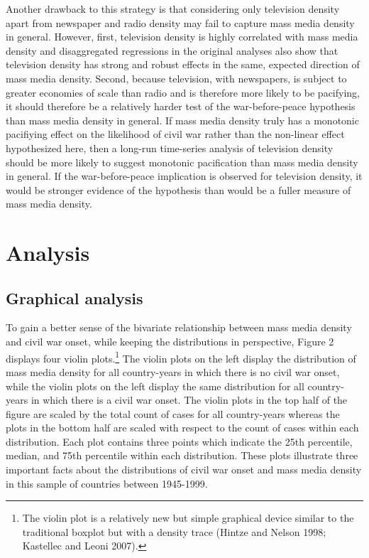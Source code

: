 \documentclass[11pt,article,oneside]{memoir}
\begin{document}
Another drawback to this strategy is that considering only television
density apart from newspaper and radio density may fail to capture mass
media density in general. However, first, television density is highly
correlated with mass media density and disaggregated regressions in the
original analyses also show that television density has strong and
robust effects in the same, expected direction of mass media density.
Second, because television, with newspapers, is subject to greater
economies of scale than radio and is therefore more likely to be
pacifying, it should therefore be a relatively harder test of the
war-before-peace hypothesis than mass media density in general. If mass
media density truly has a monotonic pacifiying effect on the likelihood
of civil war rather than the non-linear effect hypothesized here, then a
long-run time-series analysis of television density should be more
likely to suggest monotonic pacification than mass media density in
general. If the war-before-peace implication is observed for television
density, it would be stronger evidence of the hypothesis than would be a
fuller measure of mass media density.

\section{Analysis}\label{analysis}

\subsection{Graphical analysis}\label{graphical-analysis}

To gain a better sense of the bivariate relationship between mass media
density and civil war onset, while keeping the distributions in
perspective, Figure 2 displays four violin plots.\footnote{The violin
  plot is a relatively new but simple graphical device similar to the
  traditional boxplot but with a density trace (Hintze and Nelson 1998;
  Kastellec and Leoni 2007).} The violin plots on the left display the
distribution of mass media density for all country-years in which there
is no civil war onset, while the violin plots on the left display the
same distribution for all country-years in which there is a civil war
onset. The violin plots in the top half of the figure are scaled by the
total count of cases for all country-years whereas the plots in the
bottom half are scaled with respect to the count of cases within each
distribution. Each plot contains three points which indicate the 25th
percentile, median, and 75th percentile within each distribution. These
plots illustrate three important facts about the distributions of civil
war onset and mass media density in this sample of countries between
1945-1999.
\end{document}
